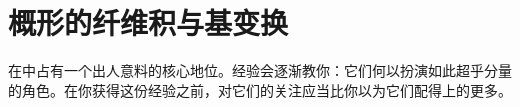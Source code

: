 
\chapter{概形的纤维积与基变换}
\label{ch:fibered-products}

\trFiberProduct{}在\trAlgebraicGeometry{}中占有一个出人意料的核心地位。经验会逐渐教你：它们何以扮演如此超乎分量的角色。在你获得这份经验之前，对它们的关注应当比你以为它们配得上的更多。








